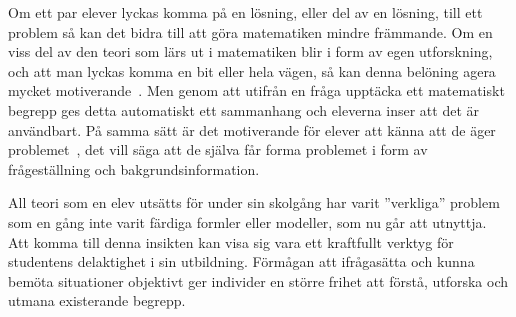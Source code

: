 
\label{sec:delaktighet}
\textcolor{WildStrawberry}{
    Om ett par elever lyckas komma på en lösning, eller del av en lösning, till ett problem så kan det bidra till att göra matematiken mindre främmande. Om en viss del av den teori som lärs ut i matematiken blir i form av egen utforskning, och att man lyckas komma en bit eller hela vägen, så kan denna belöning agera mycket motiverande~\cite{TheElephant}.} \textcolor{lila}{Men genom att utifrån en fråga upptäcka ett matematiskt begrepp ges detta automatiskt ett sammanhang och eleverna inser att det är användbart. På samma sätt är det motiverande för elever att känna att de äger problemet~\cite{TheElephant}, det vill säga att de själva får forma problemet i form av frågeställning och bakgrundsinformation.}
    
    \textcolor{WildStrawberry}{
        All teori som en elev utsätts för under sin skolgång har varit ''verkliga'' problem som en gång inte varit färdiga formler eller modeller, som nu går att utnyttja. Att komma till denna insikten kan visa sig vara ett kraftfullt verktyg för studentens delaktighet i sin utbildning. Förmågan att ifrågasätta och kunna bemöta situationer objektivt ger individer en större frihet att förstå, utforska och utmana existerande begrepp.}
        
